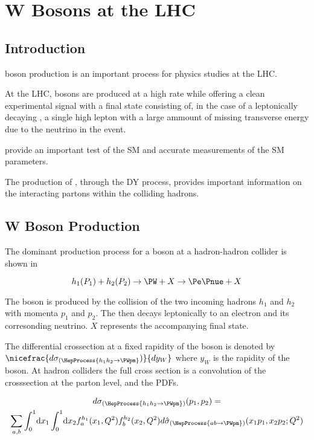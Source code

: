\chapter{W Bosons at the LHC}

\section{Introduction}

\PW boson production is an important process for physics studies at the LHC.

At the \ac{LHC}, \PW bosons are produced at a high rate while offering a clean
experimental signal with a final state consisting of, in the case of a
leptonically decaying \PW, a single high \PT lepton with a large ammount of
missing transverse energy due to the neutrino in the event.

\PW provide an important test of the \ac{SM} and accurate measurements of the
\ac{SM} parameters. 

The production of \PW, through the \ac{DY} process, provides important
information on the interacting partons within the colliding hadrons.

\section{W Boson Production}

The dominant production process for a \PW boson at a hadron-hadron collider is
shown in 

\begin{equation}
  h_1(P_1) + h_2(P_2)
  \to 
  \PW + X
  \to
  \Pe \Pnue + X
  \label{wbos:dyproc}
\end{equation}

The \PW boson is produced by the collision of the two incoming hadrons $h_1$
and $h_2$ with momenta $p_1$ and $p_2$. The \PW then decays leptonically to an
electron and its corresonding neutrino. $X$ represents the accompanying final
state.

The differential crossection at a fixed rapidity of the \PW boson is denoted by
$\nicefrac{d\sigma_{(\HepProcess{h_1 h_2 \to \PWpm}})}{dy_W}$ where $y_W$ is
the rapidity of the \PW boson. 
At hadron colliders the full cross section is a convolution of the crosssection
at the parton level, and the \acp{PDF}.

\begin{multline}
  d\sigma_{(\HepProcess{h_1 h_2 \to \PWpm})}(p_1,p_2) = \\
  \sum\limits_{a,b}
  \int_0^1 \! \mathrm{d} x_1 
  \int_0^1 \! \mathrm{d} x_2 
  f_a^{h_1}(x_1,Q^2)
  f_b^{h_2}(x_2,Q^2) 
  d\hat{\sigma}_{(\HepProcess{a b \to \PWpm})}(x_1 p_1, x_2 p_2; Q^2)
  \label{wbos:xsec}
\end{multline}

